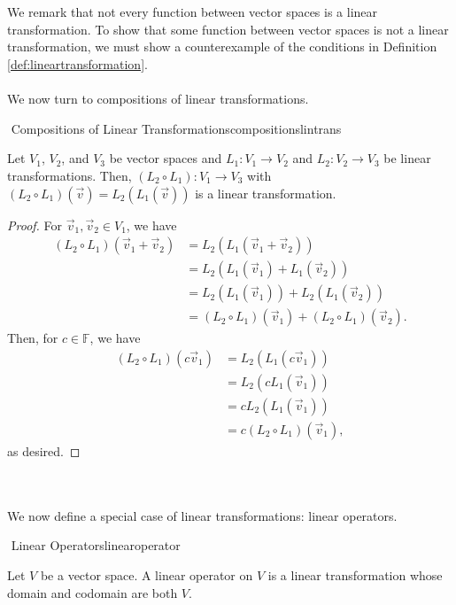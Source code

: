        \vphantom
        \\
        \\
        We remark that not every function between vector spaces is a linear transformation. To show that some function between vector spaces is not a linear transformation, we must show a counterexample of the conditions in Definition \ref{def:lineartransformation}.
        \pagebreak
        \\
        \\
        We now turn to compositions of linear transformations.
        \begin{theorem}{\Stop\,\,Compositions of Linear Transformations}{compositionslintrans}

            Let \(V_1\), \(V_2\), and \(V_3\) be vector spaces and \(L_1:V_1\to V_2\) and \(L_2:V_2\to V_3\) be linear transformations. Then, \((L_2\circ L_1):V_1\to V_3\) with \((L_2\circ L_1)(\vec{v})=L_2(L_1(\vec{v}))\) is a linear transformation.
            \begin{proof}
                For \(\vec{v}_1,\vec{v}_2\in V_1\), we have
                \begin{align*}
                    (L_2\circ L_1)(\vec{v}_1+\vec{v}_2)&=L_2(L_1(\vec{v}_1+\vec{v}_2)) \\
                    &=L_2(L_1(\vec{v}_1)+L_1(\vec{v}_2)) \\
                    &=L_2(L_1(\vec{v}_1))+L_2(L_1(\vec{v}_2)) \\
                    &=(L_2\circ L_1)(\vec{v}_1)+(L_2\circ L_1)(\vec{v}_2).
                \end{align*}
                Then, for \(c\in\mathbb{F}\), we have
                \begin{align*}
                    (L_2\circ L_1)(c\vec{v}_1)&=L_2(L_1(c\vec{v}_1)) \\
                    &=L_2(cL_1(\vec{v}_1)) \\
                    &=cL_2(L_1(\vec{v}_1)) \\
                    &=c(L_2\circ L_1)(\vec{v}_1),
                \end{align*}
                as desired.
            \end{proof}            
        \end{theorem}
        \vphantom
        \\
        \\
        We now define a special case of linear transformations: linear operators.
        \begin{definition}{\Stop\,\,Linear Operators}{linearoperator}

            Let \(V\) be a vector space. A linear operator on \(V\) is a linear transformation whose domain and codomain are both \(V\).
            
        \end{definition}

